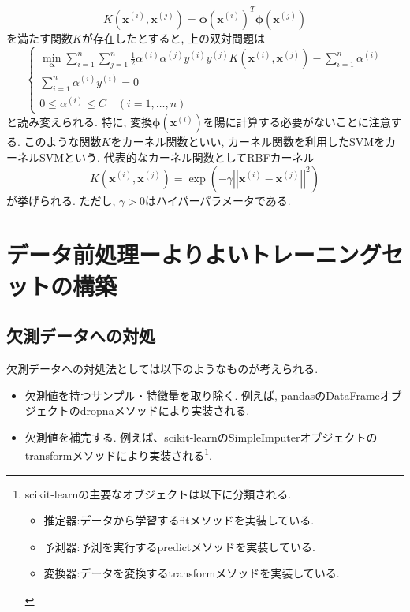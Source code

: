 \documentclass[uplatex]{jsarticle}
\theoremstyle{definition}
\numberwithin{equation}{section}
\newcommand{\norm}[1]{\left|\left|#1\right|\right|}
\begin{document}
\begin{equation}
    K(\bm{x}^{(i)}, \bm{x}^{(j)}) = \bm{\phi}(\bm{x}^{(i)})^{T}\bm{\phi}(\bm{x}^{(j)})
\end{equation}
を満たす関数$K$が存在したとすると, 上の双対問題は
\begin{equation}
    \left\{
        \begin{aligned}
            \min_{\bm{\alpha}} \sum_{i = 1}^{n} \sum_{j = 1}^{n} \frac{1}{2}\alpha^{(i)}\alpha^{(j)}y^{(i)}y^{(j)}K(\bm{x}^{(i)}, \bm{x}^{(j)}) - \sum_{i = 1}^{n} \alpha^{(i)} \\
            \sum_{i = 1}^{n} \alpha^{(i)}y^{(i)} = 0 \\
            0 \leq \alpha^{(i)} \leq C \quad (i = 1, \dots, n)
        \end{aligned}
    \right.
\end{equation}
と読み変えられる.
特に, 変換$\bm{\phi}(\bm{x}^{(i)})$を陽に計算する必要がないことに注意する.
このような関数$K$をカーネル関数といい, カーネル関数を利用したSVMをカーネルSVMという.
代表的なカーネル関数としてRBFカーネル
\begin{equation}
    K(\bm{x}^{(i)}, \bm{x}^{(j)}) = \exp\left(-\gamma\norm{\bm{x}^{(i)} - \bm{x}^{(j)}}^{2}\right)
\end{equation}
が挙げられる.
ただし, $\gamma > 0$はハイパーパラメータである.


\section{データ前処理ーよりよいトレーニングセットの構築}
\subsection{欠測データへの対処}
欠測データへの対処法としては以下のようなものが考えられる.
\begin{itemize}
    \item
    欠測値を持つサンプル・特徴量を取り除く.
    例えば, pandasのDataFrameオブジェクトのdropnaメソッドにより実装される.
    \item
    欠測値を補完する.
    例えば、scikit-learnのSimpleImputerオブジェクトのtransformメソッドにより実装される\footnote{
        scikit-learnの主要なオブジェクトは以下に分類される.
        \begin{itemize}
            \item
            推定器:データから学習するfitメソッドを実装している.
            \item
            予測器:予測を実行するpredictメソッドを実装している.
            \item
            変換器:データを変換するtransformメソッドを実装している.
        \end{itemize}
    }.
\end{itemize}
\end{document}
